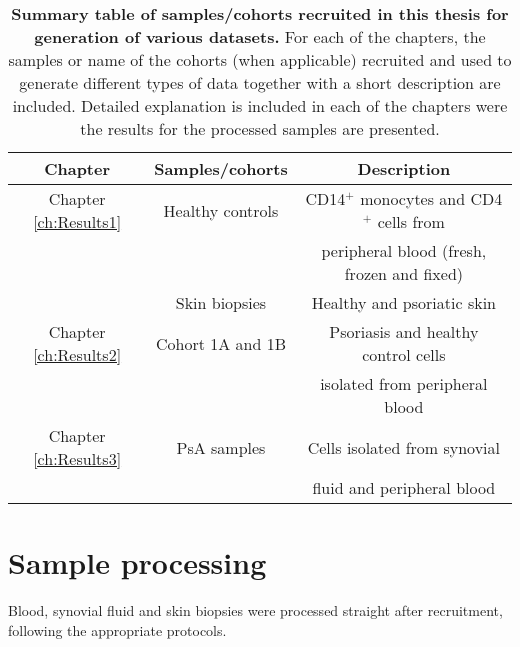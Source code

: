 \begin{table}[htbp]
\begin{tabular}{@{} c c c}
\toprule
\textbf{Chapter} & \textbf{Samples/cohorts} & \textbf{Description} \\
\midrule
\midrule
Chapter \ref{ch:Results1} & Healthy controls & CD14$^+$ monocytes and CD4$^+$ cells from \\
                          &                  & peripheral blood (fresh, frozen and fixed)\\                          
													& Skin biopsies    & Healthy and psoriatic skin \\    
Chapter \ref{ch:Results2} & Cohort 1A and 1B & Psoriasis and healthy control cells\\
                          &                  & isolated from peripheral blood \\
Chapter \ref{ch:Results3} & PsA samples      & Cells isolated from synovial \\
                          &                  & fluid and peripheral blood\\

\bottomrule
\end{tabular}
\medskip %
\caption[Summary table of samples/cohorts recruited in this thesis for generation of various datasets.]{\textbf{Summary table of samples/cohorts recruited in this thesis for generation of various datasets.} For each of the chapters, the samples or name of the cohorts (when applicable) recruited and used to generate different types of data together with a short description are included. Detailed explanation is included in each of the chapters were the results for the processed samples are presented.}
\label{tab:Summary_all_cohorts}
\end{table}
\bigskip %



\section{Sample processing}
\label{sample_processing}
Blood, synovial fluid and skin biopsies were processed straight after recruitment, following the appropriate protocols.

